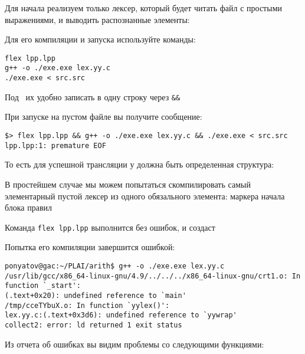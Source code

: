 
Для начала реализуем только лексер, который будет читать файл с простыми
выражениями, и выводить распознанные элементы:


Для его компиляции и запуска используйте команды:

\begin{verbatim}
flex lpp.lpp
g++ -o ./exe.exe lex.yy.c
./exe.exe < src.src
\end{verbatim}

Под \linux\ их удобно записать в одну строку через \verb|&&|

\clearpage
При запуске на пустом файле  вы получите сообщение:
\begin{verbatim}
$> flex lpp.lpp && g++ -o ./exe.exe lex.yy.c && ./exe.exe < src.src 
lpp.lpp:1: premature EOF
\end{verbatim}

То есть для успешной трансляции у   должна
быть определенная структура:



В простейшем случае мы можем попытаться скомпилировать самый элементарный
пустой лексер из одного обязального элемента: маркера начала блока правил

Команда \verb|flex lpp.lpp| выполнится без ошибок, и создаст 

Попытка его компиляции завершится ошибкой:
\begin{verbatim}
ponyatov@gac:~/PLAI/arith$ g++ -o ./exe.exe lex.yy.c 
/usr/lib/gcc/x86_64-linux-gnu/4.9/../../../x86_64-linux-gnu/crt1.o: In function `_start':
(.text+0x20): undefined reference to `main'
/tmp/cceTYbuX.o: In function `yylex()':
lex.yy.c:(.text+0x3d6): undefined reference to `yywrap'
collect2: error: ld returned 1 exit status
\end{verbatim}

Из отчета об ошибках вы видим проблемы со следующими функциями:

